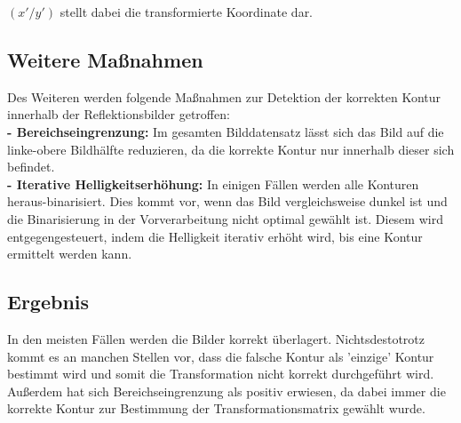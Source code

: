 \documentclass[conference]{IEEEtran}
\begin{document}
$(x'/y')$ stellt dabei die transformierte Koordinate dar.


\subsection{Weitere Maßnahmen}

Des Weiteren werden folgende Maßnahmen zur Detektion der korrekten Kontur innerhalb der Reflektionsbilder getroffen: \\

\textbf{- Bereichseingrenzung:} Im gesamten Bilddatensatz lässt sich das Bild auf die linke-obere Bildhälfte reduzieren, da die korrekte Kontur nur innerhalb dieser sich befindet. \\

\textbf{- Iterative Helligkeitserhöhung:} In einigen Fällen werden alle Konturen heraus-binarisiert. Dies kommt vor, wenn das Bild vergleichsweise dunkel ist und die Binarisierung in der Vorverarbeitung nicht optimal gewählt ist. Diesem wird entgegengesteuert, indem die Helligkeit iterativ erhöht wird, bis eine Kontur ermittelt werden kann.  \\

\subsection{Ergebnis}

In den meisten Fällen werden die Bilder korrekt überlagert. Nichtsdestotrotz kommt es an manchen Stellen vor, dass die falsche Kontur als 'einzige' Kontur bestimmt wird und somit die Transformation nicht korrekt durchgeführt wird. Außerdem hat sich Bereichseingrenzung als positiv erwiesen, da dabei immer die korrekte Kontur zur Bestimmung der Transformationsmatrix gewählt wurde.
\end{document}
